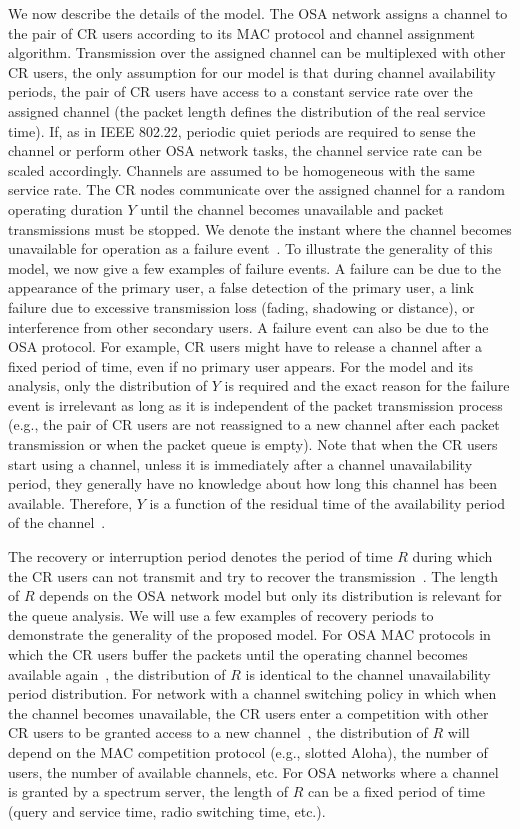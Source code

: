 \documentclass[11pt,journal,oneside,onecolumn,draftclsnofoot]{IEEEtran}
\begin{document}
We now describe the details of the model. The OSA network assigns a channel to the pair of CR users according to its MAC protocol and channel assignment algorithm. Transmission over the assigned channel can be multiplexed with other CR users, the only assumption for our model is that during channel availability periods, the pair of CR users have access to a constant service rate over the assigned channel (the packet length defines the distribution of the real service time). If, as in IEEE 802.22, periodic quiet periods are required to sense the channel or perform other OSA network tasks, the channel service rate can be scaled accordingly. Channels are assumed to be homogeneous with the same service rate.
The CR nodes communicate over the assigned channel for a random operating duration $Y$ until the channel becomes unavailable and packet transmissions must be stopped. We denote the instant where the channel becomes unavailable for operation as a failure event~\cite{azarfar11}. To illustrate the generality of this model, we now give a few examples of failure events. A failure can be due to the appearance of the primary user, a false detection of the primary user, a link failure due to excessive transmission loss (fading, shadowing or distance), or interference from other secondary users. A failure event can also be due to the OSA protocol. For example, CR users might have to release a channel after a fixed period of time, even if no primary user appears. 
For the model and its analysis, only the distribution of $Y$ is required and the exact reason for the failure event is irrelevant as long as it is independent of the packet transmission process (e.g., the pair of CR users are not reassigned to a new channel after each packet transmission or when the packet queue is empty).  Note that when the CR users start using a channel, unless it is immediately after a channel unavailability period, they generally have no knowledge about how long this channel has been available. Therefore, $Y$ is a function of the residual time of the availability period of the channel~\cite{azarfar12e}. 

The recovery or interruption period denotes the period of time $R$ during which the CR users can not transmit and try to recover the transmission~\cite{azarfar11}. The length of $R$ depends on the OSA network model but only its distribution is relevant for the queue analysis. We will use a few examples of recovery periods to demonstrate the generality of the proposed model. For OSA MAC protocols in which the CR users buffer the packets until the operating channel becomes available again~\cite{park11}, the distribution of $R$ is identical to the channel unavailability period distribution. For network with a channel switching policy in which when the channel becomes unavailable, the CR users enter a competition with other CR users to be granted access to a new channel~\cite{park11}, the distribution of $R$ will depend on the MAC competition protocol (e.g., slotted Aloha), the number of users, the number of available channels, etc. For OSA networks where a channel is granted by a spectrum server, the length of $R$ can be a fixed period of time (query and service time, radio switching time, etc.).
\end{document}
